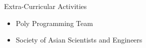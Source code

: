 \documentclass{resume} %
\begin{document}
\begin{rSection}{Extra-Curricular Activities} 
\begin{itemize} %
    \item 	Poly Programming Team
    \item   Society of Asian Scientists and Engineers

\end{itemize}


\end{rSection}
\end{document}
